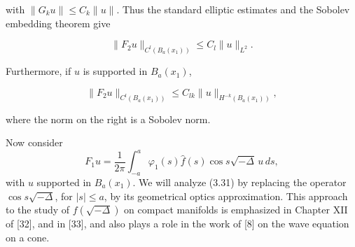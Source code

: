with $\|G_ku\|\le C_k\|u\|$. Thus the standard elliptic estimates and the Sobolev embedding theorem give

\begin{equation}\tag{3.29}
\|F_2u\|_{C^l(B_a(x_1))}\le C_l\|u\|_{L^2}.
\end{equation}

Furthermore, if $u$ is supported in $B_a(x_1)$,

\begin{equation}\tag{3.30}
\|F_2u\|_{C^l(B_a(x_1))}\le C_{lk}\|u\|_{H^{-k}(B_a(x_1))},
\end{equation}

where the norm on the right is a Sobolev norm.

Now consider
\begin{equation}\tag{3.31}
F_1u=\frac{1}{2\pi}\int_{-a}^{a}\varphi_1(s)\hat f(s)\cos s\sqrt{-\Delta}\,u\,ds,
\end{equation}
with $u$ supported in $B_a(x_1)$. We will analyze (3.31) by replacing the operator $\cos s\sqrt{-\Delta}$, for $|s|\le a$, by its geometrical optics approximation. This approach to the study of $f(\sqrt{-\Delta})$ on compact manifolds is emphasized in Chapter XII of [32], and in [33], and also plays a role in the work of [8] on the wave equation on a cone.

